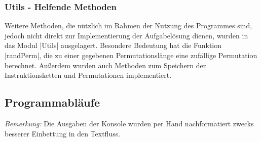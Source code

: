 \subsubsection{Utils - Helfende Methoden}
Weitere Methoden, die nützlich im Rahmen der Nutzung des Programmes sind, jedoch nicht direkt zur Implementierung der Aufgabelösung dienen,
wurden in das Modul |Utils| ausgelagert. Besondere Bedeutung hat die Funktion |randPerm|, die zu einer gegebenen Permutationslänge
eine zufällige Permutation berechnet. %
Außerdem wurden auch Methoden zum Speichern der Instruktionsketten und Permutationen implementiert.

\newpage
\subsection{Programmabläufe}
\begin{flushright}
  \begin{scriptsize}
  \emph{Bemerkung:} Die Ausgaben der Konsole wurden per Hand nachformatiert zwecks besserer Einbettung in den Textfluss.
  \end{scriptsize}
\end{flushright}

